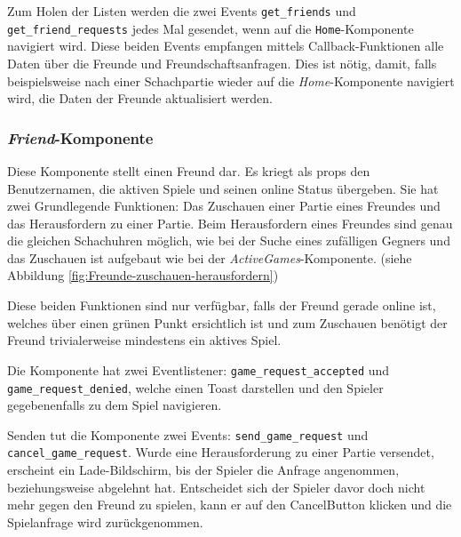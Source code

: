 Zum Holen der Listen werden die zwei Events \verb|get_friends| und \verb|get_friend_requests| jedes Mal gesendet, wenn auf die \verb|Home|-Komponente navigiert wird. Diese beiden Events empfangen mittels Callback-Funktionen alle Daten über die Freunde und Freundschaftsanfragen. Dies ist nötig, damit, falls beispielsweise nach einer Schachpartie wieder auf die \textit{Home}-Komponente navigiert wird, die Daten der Freunde aktualisiert werden.

\subsubsection{\textit{Friend}-Komponente}
\label{sec:friend-komponente}
Diese Komponente stellt einen Freund dar. Es kriegt als props den Benutzernamen, die aktiven Spiele und seinen online Status übergeben. Sie hat zwei Grundlegende Funktionen: Das Zuschauen einer Partie eines Freundes und das Herausfordern zu einer Partie. Beim Herausfordern eines Freundes sind genau die gleichen Schachuhren möglich, wie bei der Suche eines zufälligen Gegners und das Zuschauen ist aufgebaut wie bei der \textit{ActiveGames}-Komponente. (siehe Abbildung \ref{fig:Freunde-zuschauen-herausfordern})

Diese beiden Funktionen sind nur verfügbar, falls der Freund gerade online ist, welches über einen grünen Punkt ersichtlich ist und zum Zuschauen benötigt der Freund trivialerweise mindestens ein aktives Spiel.

Die Komponente hat zwei Eventlistener: \verb|game_request_accepted| und \linebreak \verb|game_request_denied|, welche einen Toast darstellen und den Spieler gegebenenfalls zu dem Spiel navigieren. 

Senden tut die Komponente zwei Events: \verb|send_game_request| und \verb|cancel_game_request|. Wurde eine Herausforderung zu einer Partie versendet, erscheint ein Lade-Bildschirm, bis der Spieler die Anfrage angenommen, beziehungsweise abgelehnt hat. Entscheidet sich der Spieler davor doch nicht mehr gegen den Freund zu spielen, kann er auf den \glqq Cancel\grqq{ }Button klicken und die Spielanfrage wird zurückgenommen.

